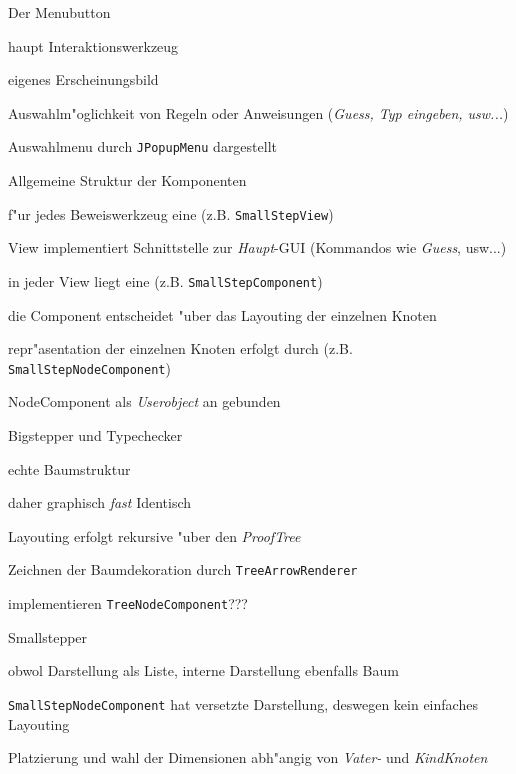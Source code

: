  {

  \begin{itemgroup}{Der Menubutton}
    \item haupt Interaktionswerkzeug
    \item eigenes Erscheinungsbild
    \item Auswahlm"oglichkeit von Regeln oder Anweisungen ({\it Guess, Typ eingeben, usw...})
    \item Auswahlmenu durch {\tt JPopupMenu} dargestellt
  \end{itemgroup}

}

 {
  \begin{itemgroup}{Allgemeine Struktur der Komponenten}
    \item f"ur jedes Beweiswerkzeug eine  (z.B. {\tt SmallStepView})
    \item View implementiert Schnittstelle zur {\it Haupt}-GUI (Kommandos wie {\it Guess}, usw...)
    \item in jeder View liegt eine  (z.B. {\tt SmallStepComponent})
    \item die Component entscheidet "uber das Layouting der einzelnen Knoten
    \item repr"asentation der einzelnen Knoten erfolgt durch  (z.B. {\tt SmallStepNodeComponent})
    \item NodeComponent als {\it Userobject} an  gebunden
    
  \end{itemgroup}
}

 {

  \begin{itemgroup}{Bigstepper und Typechecker}
    \item echte Baumstruktur
    \item daher graphisch {\it fast} Identisch
    \item Layouting erfolgt rekursive "uber den {\it ProofTree}
    \item Zeichnen der Baumdekoration durch {\tt TreeArrowRenderer}
    \item {} implementieren {\tt TreeNodeComponent}???
  \end{itemgroup}

}

 {

  \begin{itemgroup}{Smallstepper}
    \item obwol Darstellung als Liste, interne Darstellung ebenfalls Baum
    \item {\tt SmallStepNodeComponent} hat versetzte Darstellung, deswegen kein einfaches Layouting
    \item Platzierung und wahl der Dimensionen abh"angig von {\it Vater-} und {\it KindKnoten}
  
  
  \end{itemgroup}
 
}


